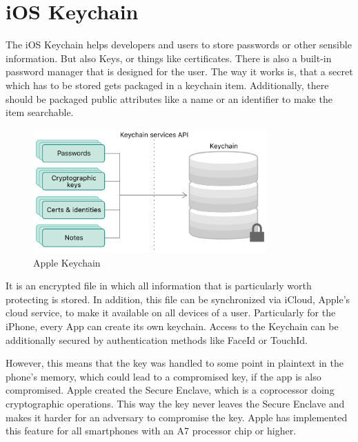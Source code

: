 \documentclass[12pt,oneside,a4paper,parskip]{scrbook}
\begin{document}

\section{iOS Keychain}

The iOS Keychain helps developers and users to store passwords or other sensible information. But also Keys, or things like certificates. There is also a built-in password manager that is designed for the user. The way it works is, that a secret which has to be stored gets packaged in a keychain item. Additionally, there should be packaged public attributes like a name or an identifier to make the item searchable. 

\begin{figure}[ht]
  \centering
  \includegraphics[width=0.8\textwidth]{ressources/apple_keychain.png}
  \caption{Apple Keychain \parencite{apple_keychain_2020}}
  \label{apple:keychain}
\end{figure}

It is an encrypted file in which all information that is particularly worth protecting is stored. In addition, this file can be synchronized via iCloud, Apple's cloud service, to make it available on all devices of a user. Particularly for the iPhone, every App can create its own keychain. Access to the Keychain can be additionally secured by authentication methods like FaceId or TouchId.

However, this means that the key was handled to some point in plaintext in the phone's memory, which could lead to a compromised key, if the app is also compromised. Apple created the Secure Enclave, which is a coprocessor doing cryptographic operations. This way the key never leaves the Secure Enclave and makes it harder for an adversary to compromise the key.
Apple has implemented this feature for all smartphones with an A7 processor chip or higher.
\parencite{apple_keychain_2020}
\end{document}
